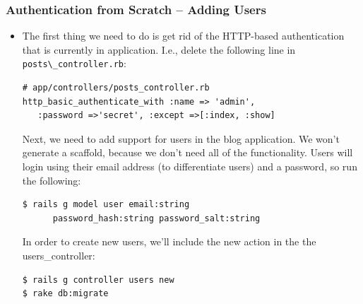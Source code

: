 \documentclass[t,handout]{beamer}
\begin{document}
\begin{frame}[fragile]\frametitle{Authentication from Scratch -- Adding Users}
 \begin{itemize}
   \item  The first thing we need to do is get rid of the HTTP-based authentication that is currently in application.  I.e., delete the following line in \lstinline!posts\_controller.rb!:
\begin{lstlisting}[frame=none]
# app/controllers/posts_controller.rb
http_basic_authenticate_with :name => 'admin',
   :password =>'secret', :except =>[:index, :show]
\end{lstlisting}
\pause
Next, we need to add support for users in the blog application.  We won't generate a scaffold, because we don't need all of the functionality. \pause
Users will login using their email address (to differentiate users) and a password, so run the following:~\\
\begin{lstlisting}[frame=none]
$ rails g model user email:string 
      password_hash:string password_salt:string
\end{lstlisting}
\pause
In order to create new users, we'll include the new action in the the users\_controller:
\begin{lstlisting}[frame=none]
$ rails g controller users new 
$ rake db:migrate
\end{lstlisting}
 \end{itemize}
\end{frame}
\end{document}
